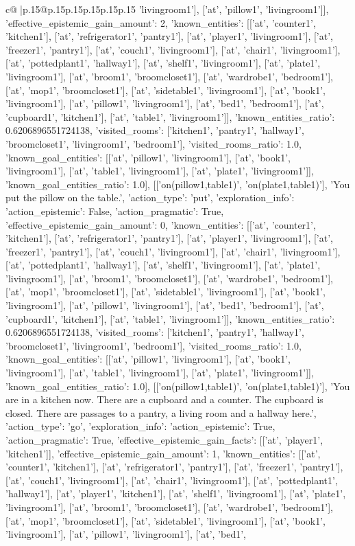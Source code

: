 \documentclass{article}
\begin{document}
{\begin{supertabular}{c@{$\;$}|p{.15\linewidth}@{}p{.15\linewidth}p{.15\linewidth}p{.15\linewidth}p{.15\linewidth}p{.15\linewidth}}
{{{'livingroom1'], ['at', 'pillow1', 'livingroom1']], 'effective_epistemic_gain_amount': 2, 'known_entities': [['at', 'counter1', 'kitchen1'], ['at', 'refrigerator1', 'pantry1'], ['at', 'player1', 'livingroom1'], ['at', 'freezer1', 'pantry1'], ['at', 'couch1', 'livingroom1'], ['at', 'chair1', 'livingroom1'], ['at', 'pottedplant1', 'hallway1'], ['at', 'shelf1', 'livingroom1'], ['at', 'plate1', 'livingroom1'], ['at', 'broom1', 'broomcloset1'], ['at', 'wardrobe1', 'bedroom1'], ['at', 'mop1', 'broomcloset1'], ['at', 'sidetable1', 'livingroom1'], ['at', 'book1', 'livingroom1'], ['at', 'pillow1', 'livingroom1'], ['at', 'bed1', 'bedroom1'], ['at', 'cupboard1', 'kitchen1'], ['at', 'table1', 'livingroom1']], 'known_entities_ratio': 0.6206896551724138, 'visited_rooms': ['kitchen1', 'pantry1', 'hallway1', 'broomcloset1', 'livingroom1', 'bedroom1'], 'visited_rooms_ratio': 1.0, 'known_goal_entities': [['at', 'pillow1', 'livingroom1'], ['at', 'book1', 'livingroom1'], ['at', 'table1', 'livingroom1'], ['at', 'plate1', 'livingroom1']], 'known_goal_entities_ratio': 1.0}}], [['on(pillow1,table1)', 'on(plate1,table1)'], 'You put the pillow on the table.', {'action_type': 'put', 'exploration_info': {'action_epistemic': False, 'action_pragmatic': True, 'effective_epistemic_gain_amount': 0, 'known_entities': [['at', 'counter1', 'kitchen1'], ['at', 'refrigerator1', 'pantry1'], ['at', 'player1', 'livingroom1'], ['at', 'freezer1', 'pantry1'], ['at', 'couch1', 'livingroom1'], ['at', 'chair1', 'livingroom1'], ['at', 'pottedplant1', 'hallway1'], ['at', 'shelf1', 'livingroom1'], ['at', 'plate1', 'livingroom1'], ['at', 'broom1', 'broomcloset1'], ['at', 'wardrobe1', 'bedroom1'], ['at', 'mop1', 'broomcloset1'], ['at', 'sidetable1', 'livingroom1'], ['at', 'book1', 'livingroom1'], ['at', 'pillow1', 'livingroom1'], ['at', 'bed1', 'bedroom1'], ['at', 'cupboard1', 'kitchen1'], ['at', 'table1', 'livingroom1']], 'known_entities_ratio': 0.6206896551724138, 'visited_rooms': ['kitchen1', 'pantry1', 'hallway1', 'broomcloset1', 'livingroom1', 'bedroom1'], 'visited_rooms_ratio': 1.0, 'known_goal_entities': [['at', 'pillow1', 'livingroom1'], ['at', 'book1', 'livingroom1'], ['at', 'table1', 'livingroom1'], ['at', 'plate1', 'livingroom1']], 'known_goal_entities_ratio': 1.0}}], [['on(pillow1,table1)', 'on(plate1,table1)'], 'You are in a kitchen now. There are a cupboard and a counter. The cupboard is closed. There are passages to a pantry, a living room and a hallway here.', {'action_type': 'go', 'exploration_info': {'action_epistemic': True, 'action_pragmatic': True, 'effective_epistemic_gain_facts': [['at', 'player1', 'kitchen1']], 'effective_epistemic_gain_amount': 1, 'known_entities': [['at', 'counter1', 'kitchen1'], ['at', 'refrigerator1', 'pantry1'], ['at', 'freezer1', 'pantry1'], ['at', 'couch1', 'livingroom1'], ['at', 'chair1', 'livingroom1'], ['at', 'pottedplant1', 'hallway1'], ['at', 'player1', 'kitchen1'], ['at', 'shelf1', 'livingroom1'], ['at', 'plate1', 'livingroom1'], ['at', 'broom1', 'broomcloset1'], ['at', 'wardrobe1', 'bedroom1'], ['at', 'mop1', 'broomcloset1'], ['at', 'sidetable1', 'livingroom1'], ['at', 'book1', 'livingroom1'], ['at', 'pillow1', 'livingroom1'], ['at', 'bed1', }}}
\end{supertabular}}
\end{document}
